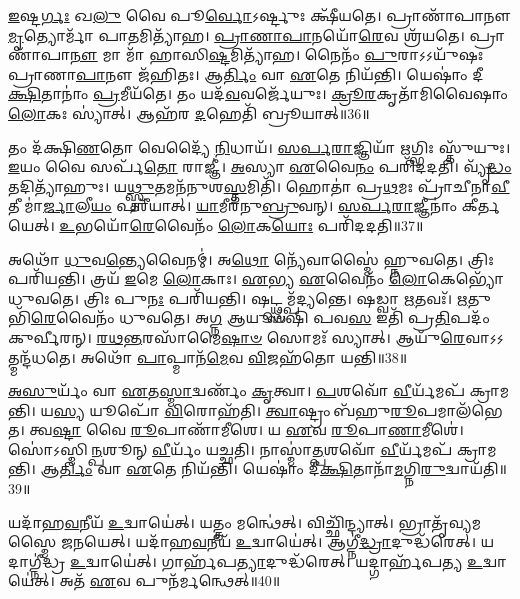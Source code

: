 \-\ul{𑌇}\-𑌷𑍍𑌟\-\ul{𑌰𑍍𑌗𑌃} 𑌖\-\ul{𑌲𑍁} 𑌵𑍈 𑌪𑍂\-\ul{𑌰𑍍𑌵𑍋}\-\-𑌽𑌰𑍍𑌷𑍍𑌟𑍁𑌃 𑌕𑍍𑌷𑍀᳴𑌯𑌤𑍇।
𑌪𑍍𑌰𑌾𑌣𑌾᳴𑌪𑌾𑌨𑍗 \ul{𑌮𑍃}\-𑌤𑍍𑌯𑍋𑌰𑍍𑌮𑌾᳴ 𑌪𑌾\-\ul{𑌤}\-𑌮𑌿𑌤𑍍𑌯𑌾᳴𑌹।
\-\ul{𑌪𑍍𑌰𑌾}\-\-\ul{𑌣𑌾}\-\-\ul{𑌪𑌾}\-𑌨𑌯𑍋᳴\-\ul{𑌰𑍇}\-𑌵 𑌶𑍍𑌰᳴𑌯𑌤𑍇।
𑌪𑍍𑌰𑌾𑌣𑌾᳴𑌪𑌾\-\ul{𑌨𑍗} 𑌮𑌾 𑌮𑌾᳴ 𑌹𑌾𑌸𑌿\-\ul{𑌷𑍍𑌟}\-𑌮𑌿𑌤𑍍𑌯𑌾᳴𑌹।
𑌨𑍈𑌨𑌂᳴ \ul{𑌪𑍁}\-𑌰𑌾\-𑌽𑌽𑌯𑍁᳴𑌷𑌃 𑌪𑍍𑌰𑌾𑌣𑌾\-\ul{𑌪𑌾}\-𑌨𑍗 𑌜᳴𑌹𑌿𑌤𑌃।
𑌆\-\ul{𑌰𑍍𑌤𑌿𑌂} 𑌵𑌾 \ul{𑌏}\-𑌤𑍇 𑌨𑌿𑌯᳴𑌨𑍍𑌤𑌿।
𑌯𑍇𑌷𑌾𑌂॑ 𑌦𑍀\-\ul{𑌕𑍍𑌷𑌿}\-𑌤𑌾𑌨𑌾𑌂॑ \ul{𑌪𑍍𑌰}\-𑌮𑍀𑌯᳴𑌤𑍇।
𑌤𑌂 𑌯𑌦᳴\-\ul{𑌵}\-𑌵𑌰𑍍𑌜𑍇᳴𑌯𑍁𑌃।
\-\ul{𑌕𑍍𑌰𑍂}\-\-\ul{𑌰}\-𑌕𑍃𑌤𑌾᳴𑌮𑌿𑌵𑍈𑌷𑌾𑌂 \ul{𑌲𑍋}\-𑌕𑌃 𑌸𑍍𑌯𑌾॑𑌤𑍍।
𑌆𑌹᳴𑌰 \ul{𑌦}\-𑌹𑍇𑌤𑌿᳴ 𑌬𑍍𑌰𑍂𑌯𑌾𑌤𑍍॥36॥

𑌤𑌂 𑌦᳴𑌕𑍍𑌷𑌿\-\ul{𑌣}\-𑌤𑍋 𑌵𑍇𑌦𑍍𑌯𑍈᳴ \ul{𑌨𑌿}\-𑌧𑌾𑌯᳴।
\-\ul{𑌸}\-\-\ul{𑌰𑍍𑌪}\-\-\ul{𑌰𑌾}\-𑌜𑍍𑌞𑌿𑌯𑌾᳴ \ul{𑌋}\-𑌗𑍍𑌭𑌿𑌃 𑌸𑍍𑌤𑍁᳴𑌯𑍁𑌃।
\-\ul{𑌇}\-𑌯𑌂 𑌵𑍈 𑌸𑌰𑍍𑌪᳴\-\ul{𑌤𑍋} 𑌰𑌾𑌜𑍍𑌞𑍀॑।
\-\ul{𑌅}\-𑌸𑍍𑌯𑌾 \ul{𑌏}\-𑌵𑍈\-\ul{𑌨𑌂} 𑌪𑌰𑌿᳴𑌦𑌦𑌤𑌿।
𑌵𑍍𑌯𑍃᳴\-\ul{𑌦𑍍𑌧𑌂} 𑌤𑌦𑌿𑌤𑍍𑌯𑌾᳴𑌹𑍁𑌃।
𑌯\-\ul{𑌥𑍍𑌸𑍍𑌤𑍁}\-𑌤𑌮𑌨᳴𑌨𑍁𑌶\-\ul{𑌸𑍍𑌤}\-𑌮𑌿𑌤𑌿᳴।
𑌹𑍋𑌤𑌾॑ 𑌪𑍍𑌰\-\ul{𑌥}\-𑌮𑌃 𑌪𑍍𑌰𑌾᳴𑌚𑍀𑌨𑌾\-\ul{𑌵𑍀}\-𑌤𑍀 𑌮𑌾॑\-\ul{𑌰𑍍𑌜𑌾}\-𑌲𑍀\-\ul{𑌯𑌂} 𑌪𑌰𑍀᳴𑌯𑌾𑌤𑍍।
\-\ul{𑌯𑌾}\-𑌮𑍀𑌰᳴𑌨𑍁\-\ul{𑌬𑍍𑌰𑍁}\-𑌵𑌨𑍍।
\-\ul{𑌸}\-\-\ul{𑌰𑍍𑌪}\-\-\ul{𑌰𑌾}\-𑌜𑍍𑌞𑍀𑌨𑌾𑌂॑ 𑌕𑍀𑌰𑍍𑌤𑌯𑍇𑌤𑍍।
\-\ul{𑌉}\-𑌭𑌯𑍋᳴\-\ul{𑌰𑍇}\-𑌵𑍈𑌨𑌂᳴ \ul{𑌲𑍋}\-𑌕\-\ul{𑌯𑍋𑌃} 𑌪𑌰𑌿᳴𑌦𑌦𑌤𑌿॥37॥

𑌅𑌥𑍋᳴ \ul{𑌧𑍁}\-𑌵\-\ul{𑌨𑍍𑌤𑍍𑌯𑍇}\-𑌵𑍈𑌨𑌮𑍍॑।
𑌅\-\ul{𑌥𑍋} 𑌨𑍍𑌯𑍇᳴𑌵𑌾𑌸𑍍𑌮𑍈॑ 𑌹𑍍𑌨𑍁𑌵𑌤𑍇।
𑌤𑍍𑌰𑌿𑌃 𑌪𑌰𑌿᳴𑌯𑌨𑍍𑌤𑌿।
𑌤𑍍𑌰𑌯᳴ \ul{𑌇}\-𑌮𑍇 \ul{𑌲𑍋}\-𑌕𑌾𑌃।
\-\ul{𑌏}\-𑌭𑍍𑌯 \ul{𑌏}\-𑌵𑍈𑌨𑌂᳴ \ul{𑌲𑍋}\-𑌕𑍇𑌭𑍍𑌯𑍋᳴ 𑌧𑍁𑌵𑌤𑍇।
𑌤𑍍𑌰𑌿𑌃 𑌪𑍁\-\ul{𑌨𑌃} 𑌪𑌰𑌿᳴𑌯𑌨𑍍𑌤𑌿।
𑌷𑌟𑍍𑌥𑍍𑌸𑌮𑍍𑌪᳴𑌦𑍍𑌯𑌨𑍍𑌤𑍇।
𑌷𑌡𑍍𑌵𑌾 \ul{𑌋}\-𑌤𑌵𑌃᳴।
\-\ul{𑌋}\-𑌤𑍁𑌭𑌿᳴\-\ul{𑌰𑍇}\-𑌵𑍈𑌨𑌂᳴ 𑌧𑍁𑌵𑌤𑍇।
𑌅\-\ul{𑌗𑍍𑌨} 𑌆𑌯𑍂𑍞᳴𑌷𑌿 𑌪𑌵\-\ul{𑌸} 𑌇𑌤𑌿᳴ 𑌪𑍍𑌰\-\ul{𑌤𑌿}\-𑌪𑌦𑌂᳴ 𑌕𑍁𑌰𑍍𑌵𑍀𑌰𑌨𑍍।
\-\ul{𑌰}\-\-\ul{𑌥}\-\-\ul{𑌨𑍍𑌤}\-𑌰𑌸𑌾᳴𑌮𑍈\-\ul{𑌷𑌾}\-\-\ul{𑍞} 𑌸𑍋𑌮𑌃᳴ 𑌸𑍍𑌯𑌾𑌤𑍍।
𑌆𑌯𑍁᳴\-\ul{𑌰𑍇}\-𑌵𑌾𑌽𑌽𑌤𑍍𑌮𑌨𑍍𑌦᳴𑌧𑌤𑍇।
𑌅𑌥𑍋᳴ \ul{𑌪𑌾}\-𑌪𑍍𑌮𑌾𑌨᳴\-\ul{𑌮𑍇}\-𑌵 \ul{𑌵𑌿}\-𑌜𑌹᳴𑌤𑍋 𑌯𑌨𑍍𑌤𑌿॥38॥\anuvakamend[\-\ul{𑌅}\-𑌭𑌿𑌜𑌿᳴𑌤𑍍𑌯𑍈 𑌪𑍃\-\ul{𑌥𑌿}\-𑌵𑍍𑌯𑌾\-\ul{𑌶𑍍𑌚} 𑌸𑍍𑌯𑌾𑌦᳴\-\ul{𑌧𑍍𑌵}\-𑌰𑍍𑌯𑍁𑌰𑍍𑌬𑍍𑌰𑍂᳴𑌯𑌾\-\ul{𑌲𑍍𑌲𑍋}\-𑌕\-\ul{𑌯𑍋𑌃} 𑌪𑌰𑌿᳴𑌦𑌦𑌤𑌿 𑌕𑍁𑌰𑍍𑌵𑍀\-\ul{𑌰}\-\-\ul{𑍟}\-𑌸𑍍𑌤𑍍𑌰𑍀𑌣𑌿᳴ 𑌚]

\-\ul{𑌅}\-\-\ul{𑌸𑍁}\-𑌰𑍍𑌯𑌂᳴ 𑌵𑌾 \ul{𑌏}\-𑌤\-\ul{𑌸𑍍𑌮𑌾}\-𑌦𑍍𑌵𑌰𑍍𑌣𑌂᳴ \ul{𑌕𑍃}\-𑌤𑍍𑌵𑌾।
\-\ul{𑌪}\-𑌶𑌵𑍋᳴ \ul{𑌵𑍀}\-𑌰𑍍𑌯᳴𑌮𑌪᳴ 𑌕𑍍𑌰𑌾𑌮𑌨𑍍𑌤𑌿।
𑌯\-\ul{𑌸𑍍𑌯} 𑌯𑍂𑌪𑍋᳴ \ul{𑌵𑌿}\-𑌰𑍋𑌹᳴𑌤𑌿।
\-\ul{𑌤𑍍𑌵𑌾}\-𑌷𑍍𑌟𑍍𑌰𑌂 𑌬᳴𑌹𑍁\-\ul{𑌰𑍂}\-𑌪𑌮𑌾𑌲᳴𑌭𑍇𑌤।
𑌤𑍍𑌵\-\ul{𑌷𑍍𑌟𑌾} 𑌵𑍈 \ul{𑌰𑍂}\-𑌪𑌾𑌣𑌾᳴𑌮𑍀𑌶𑍇।
𑌯 \ul{𑌏}\-𑌵 \ul{𑌰𑍂}\-𑌪𑌾\-\ul{𑌣𑌾}\-𑌮𑍀𑌶𑍇॑।
𑌸𑍋॑𑌽𑌸𑍍𑌮𑌿\-\ul{𑌨𑍍𑌪}\-𑌶𑍂𑌨𑍍 \ul{𑌵𑍀}\-𑌰𑍍𑌯𑌂᳴ 𑌯𑌚𑍍𑌛𑌤𑌿।
𑌨𑌾𑌸𑍍𑌮𑌾॑\-\ul{𑌤𑍍𑌪}\-𑌶𑌵𑍋᳴ \ul{𑌵𑍀}\-𑌰𑍍𑌯᳴𑌮𑌪᳴ 𑌕𑍍𑌰𑌾𑌮𑌨𑍍𑌤𑌿।
𑌆\-\ul{𑌰𑍍𑌤𑌿𑌂} 𑌵𑌾 \ul{𑌏}\-𑌤𑍇 𑌨𑌿𑌯᳴𑌨𑍍𑌤𑌿।
𑌯𑍇𑌷𑌾𑌂॑ 𑌦𑍀\-\ul{𑌕𑍍𑌷𑌿}\-𑌤𑌾𑌨𑌾᳴\-\ul{𑌮}\-𑌗𑍍𑌨𑌿\-\ul{𑌰𑍁}\-𑌦𑍍𑌵𑌾𑌯᳴𑌤𑌿॥39॥

𑌯𑌦𑌾᳴𑌹\-\ul{𑌵}\-𑌨𑍀𑌯᳴ \ul{𑌉}\-𑌦𑍍𑌵𑌾𑌯𑍇॑𑌤𑍍।
𑌯𑌤𑍍𑌤𑌂 𑌮𑌨𑍍𑌥𑍇॑𑌤𑍍।
𑌵𑌿𑌚𑍍𑌛𑌿᳴𑌨𑍍𑌦𑍍𑌯𑌾𑌤𑍍।
𑌭𑍍𑌰𑌾𑌤𑍃᳴𑌵𑍍𑌯𑌮𑌸𑍍𑌮𑍈 𑌜𑌨𑌯𑍇𑌤𑍍।
𑌯𑌦𑌾᳴𑌹\-\ul{𑌵}\-𑌨𑍀𑌯᳴ \ul{𑌉}\-𑌦𑍍𑌵𑌾𑌯𑍇॑𑌤𑍍।
𑌆𑌗𑍍𑌨𑍀॑\-\ul{𑌦𑍍𑌧𑍍𑌰𑌾}\-𑌦𑍁𑌦𑍍𑌧᳴\-𑌰𑍇𑌤𑍍।
𑌯𑌦𑌾𑌗𑍍𑌨𑍀॑𑌦𑍍𑌧𑍍𑌰 \ul{𑌉}\-𑌦𑍍𑌵𑌾𑌯𑍇॑𑌤𑍍।
𑌗𑌾𑌰𑍍\mbox{}𑌹᳴𑌪\-\ul{𑌤𑍍𑌯𑌾}\-𑌦𑍁𑌦𑍍𑌧᳴𑌰𑍇𑌤𑍍।
𑌯𑌦𑍍𑌗𑌾𑌰𑍍\mbox{}𑌹᳴𑌪𑌤𑍍𑌯 \ul{𑌉}\-𑌦𑍍𑌵𑌾𑌯𑍇॑𑌤𑍍।
𑌅𑌤᳴ \ul{𑌏}\-𑌵 𑌪𑍁𑌨᳴𑌰𑍍𑌮𑌨𑍍𑌥𑍇𑌤𑍍॥40॥

